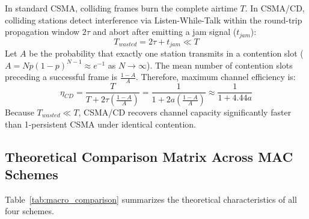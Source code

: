 \documentclass[11pt,a4paper]{article}
\begin{document}
\begin{proofbox}
In standard CSMA, colliding frames burn the complete airtime $T$. In CSMA/CD, colliding stations detect interference via Listen-While-Talk within the round-trip propagation window $2\tau$ and abort after emitting a jam signal ($t_{jam}$):
\begin{equation}
    T_{wasted} = 2\tau + t_{jam} \ll T
\end{equation}
Let $A$ be the probability that exactly one station transmits in a contention slot ($A = N p (1-p)^{N-1} \approx e^{-1}$ as $N \to \infty$). The mean number of contention slots preceding a successful frame is $\frac{1-A}{A}$. Therefore, maximum channel efficiency is:
\begin{equation}
    \eta_{CD} = \frac{T}{T + 2\tau \left(\frac{1 - A}{A}\right)} = \frac{1}{1 + 2a \left(\frac{1 - A}{A}\right)} \approx \frac{1}{1 + 4.44 a}
\end{equation}
Because $T_{wasted} \ll T$, CSMA/CD recovers channel capacity significantly faster than 1-persistent CSMA under identical contention.
\end{proofbox}

\subsection{Theoretical Comparison Matrix Across MAC Schemes}
Table~\ref{tab:macro_comparison} summarizes the theoretical characteristics of all four schemes.
\end{document}
